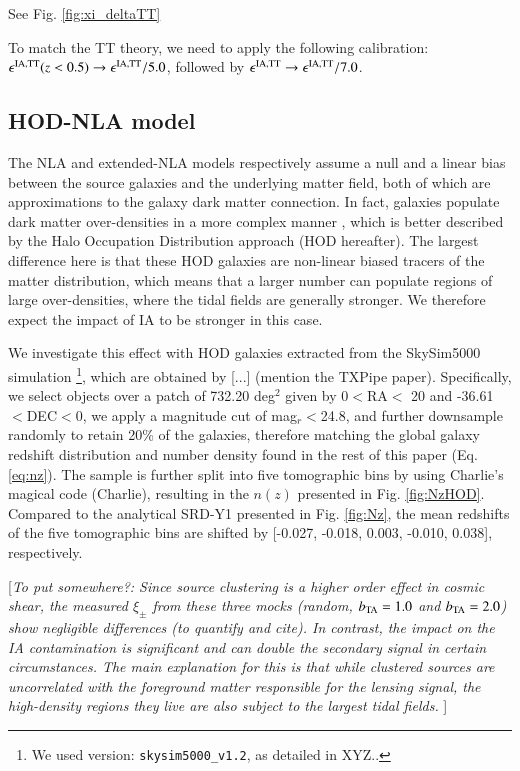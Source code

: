 See Fig. \ref{fig:xi_deltaTT}

To match the TT theory, we need to apply the following calibration: $\epsilon^{\rm IA, TT}(z<0.5) \rightarrow \epsilon^{\rm IA, TT} /5.0$, followed by $\epsilon^{\rm IA, TT} \rightarrow \epsilon^{\rm IA, TT}/7.0$.

\subsection{HOD-NLA model}
\label{subsec:HOD}







The NLA and extended-NLA models respectively assume a null and a linear bias between the source galaxies and the underlying matter field, both of which are approximations to the galaxy dark matter connection.
In fact, galaxies populate dark matter over-densities in a more complex manner \citep{GalaxyPopulationPapers}, which is better described by the Halo Occupation Distribution approach (HOD hereafter).
The largest difference here is that these HOD galaxies are non-linear biased tracers of the matter distribution, which means that a larger number can populate regions of large over-densities, where the tidal fields are generally stronger. 
We therefore expect the impact of IA to be stronger in this case.

We investigate this effect with HOD galaxies extracted from the SkySim5000 simulation \citep{SkySim5000_HOD} \footnote{We used version: {\tt skysim5000\_v1.2}, as detailed in XYZ..}, which are obtained by [...] (mention the TXPipe paper).
Specifically, we select objects over a patch of 732.20 deg$^2$ given by  0$<$RA$<$ 20 and -36.61$<$DEC$<$0, we apply a magnitude cut of mag$_r<$24.8, and further downsample randomly to retain 20\% of the galaxies, 
therefore matching the global galaxy redshift distribution and number density found in the rest of this paper (Eq. \ref{eq:nz}).
The sample is further split into five tomographic bins by using Charlie's magical code (Charlie), resulting in the $n(z)$ presented in Fig. \ref{fig:NzHOD}. 
Compared to the analytical SRD-Y1 presented in Fig. \ref{fig:Nz}, the mean redshifts of the five tomographic bins are shifted by [-0.027, -0.018,  0.003, -0.010,  0.038], respectively.

[{\it To put somewhere?: Since source clustering is a higher order effect in cosmic shear, the measured $\xi_{\pm}$ from these three mocks (random, $b_{\rm TA}=1.0$ and $b_{\rm TA}=2.0$) show negligible differences ({\it to quantify and cite}). 
In contrast, the impact on the IA contamination is significant and can double the secondary signal in certain circumstances. 
The main explanation for this is that while clustered sources are uncorrelated with the foreground matter responsible for the lensing signal, the high-density regions they live are also subject to the largest tidal fields. 
}]


